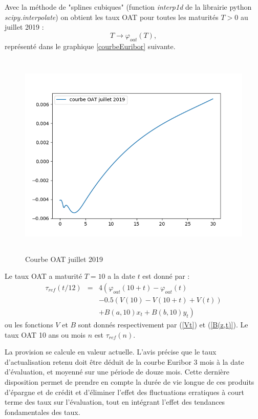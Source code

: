 \documentclass[12pt, a4paper]{book}
\begin{document}
Avec la méthode de "splines cubiques" (function {\it interp1d} de la librairie python {\it scipy.interpolate}) on obtient les taux OAT pour toutes les maturités $T>0$ au juillet 2019 :
$$T \rightarrow \varphi_{oat}(T),$$
représenté dans le graphique \ref{courbeEuribor} suivante.


\begin{figure}[!h]
\label{courbeOAT}
\centering
\includegraphics[height=10cm,width=16cm]{courbeOAT.png}
\caption{Courbe OAT juillet 2019}
\end{figure}

Le taux OAT a maturité $T =10$ a la date $t$ est donné par :
\begin{eqnarray}
\tau_{ref}(t/12) &=& 4\left( \varphi_{oat}(10+t)-\varphi_{oat}(t)\right.\nonumber\\
& &-0.5(V(10)-V(10+t)+V(t))\nonumber\\
& &\left.+B(a, 10)x_t + B(b, 10)y_t\right)\label{t_oat}
\end{eqnarray}
ou les fonctions $V$ et $B$ sont donnés respectivement par (\ref{Vt}) et (\ref{B(z,t)}). Le taux OAT 10 ans ou mois $n$ est $\tau_{ref}(n)$.

La provision se calcule en valeur actuelle. L'avis \cite{CNC1} précise que le taux d'actualisation retenu doit être déduit de la courbe Euribor 3 mois à la date d’évaluation, et moyenné sur une période de douze mois. Cette dernière disposition permet de prendre en compte la durée de vie longue de ces produits d'épargne et de crédit et d'éliminer l'effet des fluctuations erratiques à court terme des taux sur l'évaluation, tout en intégrant l'effet des tendances fondamentales des taux.
\end{document}
